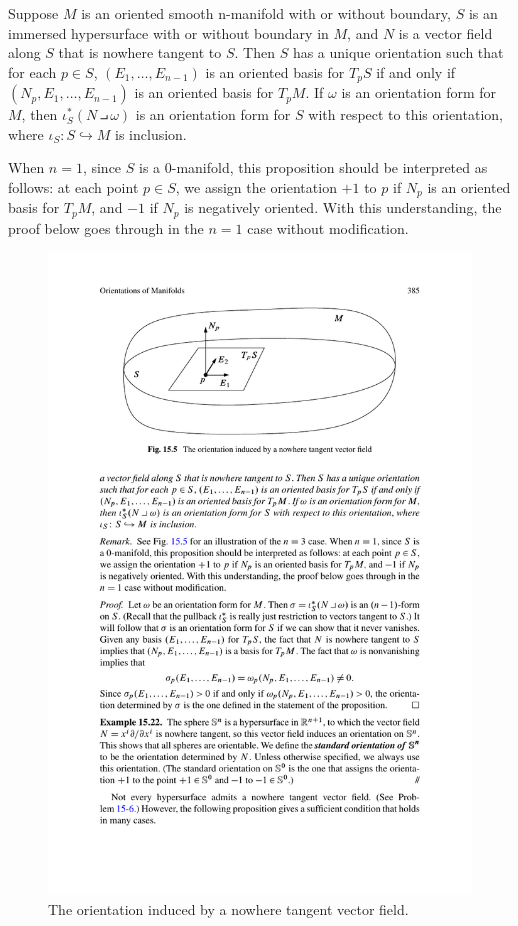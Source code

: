 \begin{proposition}\label{orientation hypersurface}
Suppose $M$ is an oriented smooth n-manifold with or without boundary, $S$ is an immersed hypersurface with or without boundary in $M$, and $N$ is a vector field along $S$ that is nowhere tangent to $S$. Then $S$ has a unique orientation such that for each $p\in S$, $(E_1,\dots,E_{n-1})$ is an oriented basis for $T_pS$ if and only if $(N_p,E_1,\dots,E_{n-1})$ is an oriented basis for $T_pM$. If $\omega$ is an orientation form for $M$, then $\iota^*_S(N\intprod\omega)$ is an orientation form for $S$ with respect to this orientation, where $\iota_S:S\hookrightarrow M$ is inclusion.
\end{proposition}
\begin{remark}
When $n=1$, since $S$ is a $0$-manifold, this proposition should be interpreted as follows: at each point $p\in S$, we assign the orientation $+1$ to $p$ if $N_p$ is an oriented basis for $T_pM$, and $-1$ if $N_p$ is negatively oriented. With this understanding, the proof below goes through in the $n=1$ case without modification.
\end{remark}
\begin{figure}[htbp]
\centering
\includegraphics{pictures/orientation-hyper}
\caption{The orientation induced by a nowhere tangent vector field.}
\end{figure}
